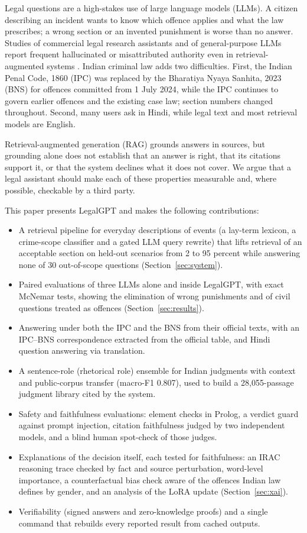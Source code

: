 \documentclass[conference]{IEEEtran}
\begin{document}
Legal questions are a high-stakes use of large language models (LLMs). A citizen describing an
incident wants to know which offence applies and what the law prescribes; a wrong section or an
invented punishment is worse than no answer. Studies of commercial legal research assistants and of
general-purpose LLMs report frequent hallucinated or misattributed authority even in
retrieval-augmented systems \cite{magesh2025hallucination,dahl2024fictions}. Indian criminal law adds
two difficulties. First, the Indian Penal Code, 1860 (IPC) \cite{ipc} was replaced by the Bharatiya
Nyaya Sanhita, 2023 (BNS) \cite{bns} for offences committed from 1 July 2024, while the IPC continues
to govern earlier offences and the existing case law; section numbers changed throughout. Second,
many users ask in Hindi, while legal text and most retrieval models are English.

Retrieval-augmented generation (RAG) \cite{lewis2020rag} grounds answers in sources, but grounding
alone does not establish that an answer is right, that its citations support it, or that the system
declines what it does not cover. We argue that a legal assistant should make each of these properties
measurable and, where possible, checkable by a third party.

This paper presents LegalGPT and makes the following contributions:
\begin{itemize}
\item A retrieval pipeline for everyday descriptions of events (a lay-term lexicon, a crime-scope
classifier and a gated LLM query rewrite) that lifts retrieval of an acceptable section on held-out
scenarios from 2 to 95 percent while answering none of 30 out-of-scope questions (Section~\ref{sec:system}).
\item Paired evaluations of three LLMs alone and inside LegalGPT, with exact McNemar tests, showing
the elimination of wrong punishments and of civil questions treated as offences (Section~\ref{sec:results}).
\item Answering under both the IPC and the BNS from their official texts, with an IPC--BNS
correspondence extracted from the official table, and Hindi question answering via translation.
\item A sentence-role (rhetorical role) ensemble for Indian judgments with context and public-corpus
transfer (macro-F1 0.807), used to build a 28,055-passage judgment library cited by the system.
\item Safety and faithfulness evaluations: element checks in Prolog, a verdict guard against
prompt injection, citation faithfulness judged by two independent models, and a blind human
spot-check of those judges.
\item Explanations of the decision itself, each tested for faithfulness: an IRAC reasoning trace
checked by fact and source perturbation, word-level importance, a counterfactual bias check aware of
the offences Indian law defines by gender, and an analysis of the LoRA update (Section~\ref{sec:xai}).
\item Verifiability (signed answers and zero-knowledge proofs) and a single command that rebuilds
every reported result from cached outputs.
\end{itemize}
\end{document}
